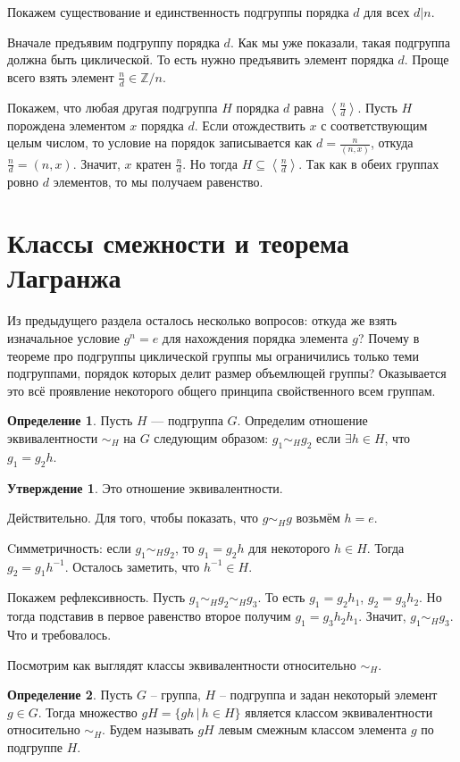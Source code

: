 \documentclass[10pt,a4paper,oneside]{book}
\theoremstyle{definition}
\newtheorem*{defn}{\color{yellow!30!red} Определение}
\newtheorem{utvr}{\color{blue!50!black}Утверждение}
\newcommand{\mb}[1]{\mathbb{#1}}
\def\lan{\left\langle }
\def\ran{\right\rangle}
\def\dfn{\begin{defn}}
\def\edfn{\end{defn}}
\def\utv{\begin{utvr}}
\def\eutv{\end{utvr}}
\begin{document}
Покажем существование и единственность подгруппы порядка $d$ для всех $d|n$.

Вначале предъявим подгруппу порядка $d$. Как мы уже показали, такая подгруппа должна быть циклической. То есть нужно предъявить элемент порядка $d$. Проще всего взять элемент $\frac{n}{d}\in \mb Z/n$.

Покажем, что любая другая подгруппа $H$ порядка $d$ равна $\lan \frac{n}{d} \ran$. Пусть $H$ порождена элементом $x$ порядка $d$. Если отождествить $x$ с соответствующим целым числом, то условие на порядок записывается как  $d=\frac{n}{(n,x)}$, откуда $\frac{n}{d}=(n,x)$. Значит, $x$ кратен $\frac{n}{d}$. Но тогда $H \subseteq \lan\frac{n}{d}\ran$. Так как в обеих группах ровно $d$ элементов, то мы получаем равенство.
\endproof




\section{Классы смежности и теорема Лагранжа}

Из предыдущего раздела осталось несколько вопросов: откуда же взять изначальное условие $g^n=e$ для нахождения порядка элемента $g$? Почему в теореме про подгруппы циклической группы мы ограничились только теми подгруппами, порядок которых делит размер объемлющей группы? Оказывается это всё проявление некоторого общего принципа свойственного всем группам.


\dfn Пусть $H$ --- подгруппа $G$. Определим отношение эквивалентности $\sim_H$ на $G$ следующим образом: $g_1\sim_H g_2$ если $\exists h \in H$, что $g_1=g_2 h$.
\edfn

\utv Это отношение эквивалентности.
\eutv
\proof Действительно. Для того, чтобы показать, что $g\sim_H g$ возьмём $h=e$. 

Cимметричность: если $g_1 \sim_H g_2$, то $g_1=g_2h$ для некоторого $h\in H$. Тогда $g_2=g_1h^{-1}$. Осталось заметить, что $h^{-1}\in H$.

Покажем рефлексивность. Пусть $g_1\sim_H g_2 \sim_H g_3$.  То есть $g_1=g_2h_1$, $g_2=g_3h_2$. Но тогда подставив в первое равенство второе получим $g_1=g_3h_2h_1$. Значит, $g_1\sim_H g_3$. Что и требовалось. 
\endproof

Посмотрим как выглядят классы эквивалентности относительно $\sim_H$.

\dfn Пусть $G$ -- группа, $H$ -- подгруппа и задан некоторый элемент $g\in G$. Тогда множество $gH=\{ gh\,|\, h \in H\}$ является классом эквивалентности относительно $\sim_H$. Будем называть $gH$ левым смежным  классом элемента $g$ по подгруппе $H$. 
\edfn
\end{document}
